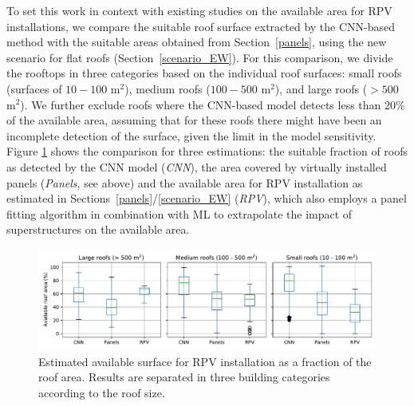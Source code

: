 To set this work in context with existing studies on the available area for RPV installations, we compare the suitable roof surface extracted by the CNN-based method with the suitable areas obtained from Section~\ref{panels}, using the new scenario for flat roofs (Section~\ref{scenario_EW}). For this comparison, we divide the rooftops in three categories based on the individual roof surfaces: small roofs (surfaces of $10-100$ m$^2$), medium roofs ($100-500$ m$^2$), and large roofs ($>500$ m$^2$). We further exclude roofs where the CNN-based model detects less than 20\% of the available area, assuming that for these roofs there might have been an incomplete detection of the surface, given the limit in the model sensitivity. Figure \ref{fig:CNN_boxplots} shows the comparison for three estimations: the suitable fraction of roofs as detected by the CNN model (\textit{CNN}), the area covered by virtually installed panels (\textit{Panels}, see above) and the available area for RPV installation as estimated in Sections~\ref{panels}/\ref{scenario_EW} (\textit{RPV}), which also employs a panel fitting algorithm in combination with ML to extrapolate the impact of superstructures on the available area.

\begin{figure}[tb]
\centering
\includegraphics[width=\linewidth]{images/Figs/boxplots_area_cmp_min20pct.pdf}
\caption{Estimated available surface for RPV installation as a fraction of the roof area. Results are separated in three building categories according to the roof size.}
\label{fig:CNN_boxplots}
\end{figure}

